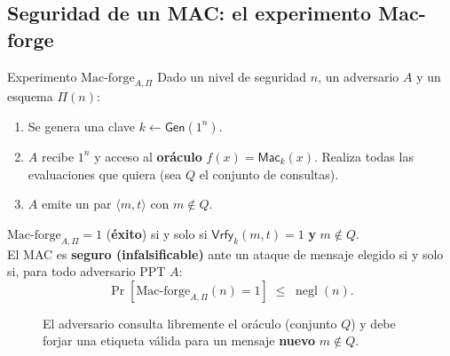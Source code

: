 \documentclass[11pt,a4paper]{article}
\newcommand{\Mac}{\mathsf{Mac}}
\newcommand{\Vrfy}{\mathsf{Vrfy}}
\newcommand{\Gen}{\mathsf{Gen}}
\DeclareMathOperator{\negl}{negl}
\begin{document}
\subsection{Seguridad de un MAC: el experimento Mac-forge}

\begin{defbox}{Experimento $\mathrm{Mac\text{-}forge}_{A,\Pi}$}
Dado un nivel de seguridad $n$, un adversario $A$ y un esquema $\Pi(n)$:
\begin{enumerate}[leftmargin=1.6em,itemsep=1pt]
  \item Se genera una clave $k\leftarrow\Gen(1^n)$.
  \item $A$ recibe $1^n$ y acceso al \textbf{oráculo} $f(x)=\Mac_k(x)$.
        Realiza todas las evaluaciones que quiera (sea $Q$ el conjunto de consultas).
  \item $A$ emite un par $\langle m,t\rangle$ con $m\notin Q$.
\end{enumerate}
$\mathrm{Mac\text{-}forge}_{A,\Pi}=1$ (\textbf{éxito}) si y solo si
$\Vrfy_k(m,t)=1$ \textbf{y} $m\notin Q$.\\[2pt]
El MAC es \textbf{seguro (infalsificable)} ante un ataque de mensaje elegido si y solo si,
para todo adversario PPT $A$:
\[
  \Pr[\mathrm{Mac\text{-}forge}_{A,\Pi}(n)=1]\;\le\;\negl(n).
\]
\end{defbox}

\begin{figure}[h]
\centering
{}
\caption{El adversario consulta libremente el oráculo (conjunto $Q$) y debe forjar una
etiqueta válida para un mensaje \textbf{nuevo} $m\notin Q$.}
\end{figure}
\end{document}
